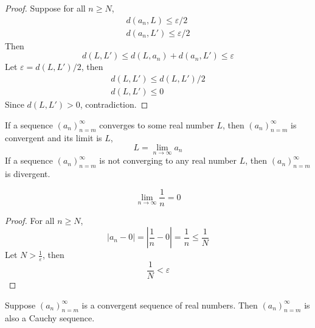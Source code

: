 \documentclass{blog}
\begin{document}
\begin{proof}
  Suppose for all $n \geq N$,
  \begin{gather*}
    d(a_{n}, L) \leq \varepsilon / 2 \\
    d(a_{n}, L') \leq \varepsilon / 2
  \end{gather*}
  Then
  \begin{equation*}
    d(L, L') \leq d(L, a_{n}) + d(a_{n}, L') \leq \varepsilon
  \end{equation*}
  Let $\varepsilon = d(L, L') / 2$, then
  \begin{gather*}
    d(L, L') \leq d(L, L') / 2 \\
    d(L, L') \leq 0
  \end{gather*}
  Since $d(L, L') > 0$, contradiction.
\end{proof}

\begin{definition}[limit]
  If a sequence $(a_{n})_{n = m}^{\infty}$ converges to some real number $L$,
  then $(a_{n})_{n = m}^{\infty}$ is convergent and its limit is $L$,
  \begin{equation}
    \label{EQ:LIMIT}
    L = \lim_{n \to \infty} a_{n}
  \end{equation}
  If a sequence $(a_{n})_{n = m}^{\infty}$ is not converging to any real number $L$,
  then $(a_{n})_{n = m}^{\infty}$ is divergent.
\end{definition}

\begin{proposition}
  \begin{equation}
    \lim_{n \to \infty} \frac{1}{n} = 0
  \end{equation}
\end{proposition}

\begin{proof}
  For all $n \geq N$,
  \begin{equation*}
    |a_{n} - 0| = |\frac{1}{n} - 0| = \frac{1}{n} \leq \frac{1}{N}
  \end{equation*}
  Let $N > \frac{1}{\varepsilon}$, then
  \begin{equation*}
    \frac{1}{N} < \varepsilon
  \end{equation*}
\end{proof}

\begin{proposition}
  Suppose $(a_{n})_{n = m}^{\infty}$ is a convergent sequence of real numbers.
  Then $(a_{n})_{n = m}^{\infty}$ is also a Cauchy sequence.
\end{proposition}
\end{document}
